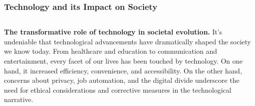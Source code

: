\documentclass[5pt]{beamer}
\begin{document}
\begin{frame}
\frametitle{Technology and its Impact on Society}
\begin{columns}
\begin{column}{0.7\textwidth}
\begin{block}{\textbf{The transformative role of technology in societal evolution.}}
It's undeniable that technological advancements have dramatically shaped the society we know today. From healthcare and education to communication and entertainment, every facet of our lives has been touched by technology. On one hand, it increased efficiency, convenience, and accessibility. On the other hand, concerns about privacy, job automation, and the digital divide underscore the need for ethical considerations and corrective measures in the technological narrative.
\end{block}
\end{column}
\end{columns}
\end{frame}
\end{document}
